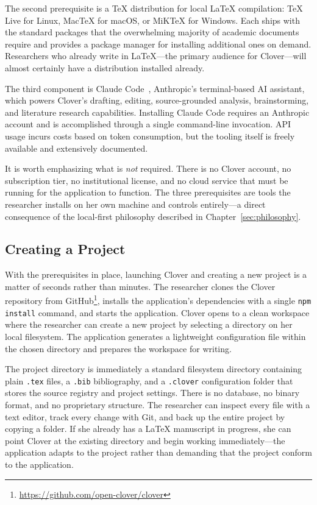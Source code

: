 \documentclass[a4paper,11pt]{article}
\begin{document}
The second prerequisite is a \TeX{} distribution for local \LaTeX{} compilation: TeX Live for Linux, MacTeX for macOS, or MiKTeX for Windows. Each ships with the standard packages that the overwhelming majority of academic documents require and provides a package manager for installing additional ones on demand. Researchers who already write in \LaTeX{}---the primary audience for Clover---will almost certainly have a distribution installed already.

The third component is Claude Code~\cite{ClaudeCode}, Anthropic's terminal-based AI assistant, which powers Clover's drafting, editing, source-grounded analysis, brainstorming, and literature research capabilities. Installing Claude Code requires an Anthropic account and is accomplished through a single command-line invocation. API usage incurs costs based on token consumption, but the tooling itself is freely available and extensively documented.

It is worth emphasizing what is \emph{not} required. There is no Clover account, no subscription tier, no institutional license, and no cloud service that must be running for the application to function. The three prerequisites are tools the researcher installs on her own machine and controls entirely---a direct consequence of the local-first philosophy described in Chapter~\ref{sec:philosophy}.

\subsection{Creating a Project}

With the prerequisites in place, launching Clover and creating a new project is a matter of seconds rather than minutes. The researcher clones the Clover repository from GitHub\footnote{\url{https://github.com/open-clover/clover}}, installs the application's dependencies with a single \texttt{npm install} command, and starts the application. Clover opens to a clean workspace where the researcher can create a new project by selecting a directory on her local filesystem. The application generates a lightweight configuration file within the chosen directory and prepares the workspace for writing.

The project directory is immediately a standard filesystem directory containing plain \texttt{.tex} files, a \texttt{.bib} bibliography, and a \texttt{.clover} configuration folder that stores the source registry and project settings. There is no database, no binary format, and no proprietary structure. The researcher can inspect every file with a text editor, track every change with Git, and back up the entire project by copying a folder. If she already has a \LaTeX{} manuscript in progress, she can point Clover at the existing directory and begin working immediately---the application adapts to the project rather than demanding that the project conform to the application.
\end{document}
